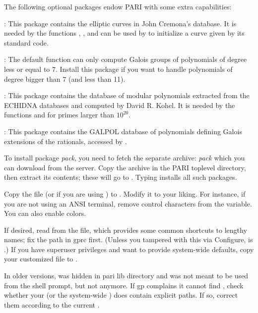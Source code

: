  The following optional packages endow PARI with some
extra capabilities:

\item {}: This package contains the elliptic curves in
John Cremona's database. It is needed by the functions ,
,  and can be used by  to initialize a curve given by its standard code.

\item {}: The default  function can only
compute Galois groups of polynomials of degree less or equal to 7. Install
this package if you want to handle polynomials of degree bigger than 7 (and
less than 11).

\item {}: This package contains the database of modular
polynomials extracted from the ECHIDNA databases and computed by David R.
Kohel. It is needed by the functions  and  for
primes larger than $10^{20}$.

\item {}: This package contains the GALPOL database of polynomials
defining Galois extensions of the rationals, accessed by .

\medskip

To install package \emph{pack}, you need to fetch the separate archive:
\emph{pack} which you can download from the  server.
Copy the archive in the PARI toplevel directory, then extract its
contents; these will go to . Typing  installs all such packages.

 Copy the file  (or
 if you are using ) to . Modify
it to your liking. For instance, if you are not using an ANSI terminal,
remove control characters from the  variable. You can also
enable colors.

If desired, read   from the 
file, which provides some common shortcuts to lengthy names; fix the path in
gprc first. (Unless you tampered with this via Configure,  is
.) If you have superuser privileges and want to
provide system-wide defaults, copy your customized  file to
.

In older versions,  was hidden in pari lib directory and was not
meant to be used from the shell prompt, but not anymore. If gp complains it
cannot find , check whether your  (or the system-wide
) does contain explicit paths. If so, correct them according to the
current .

